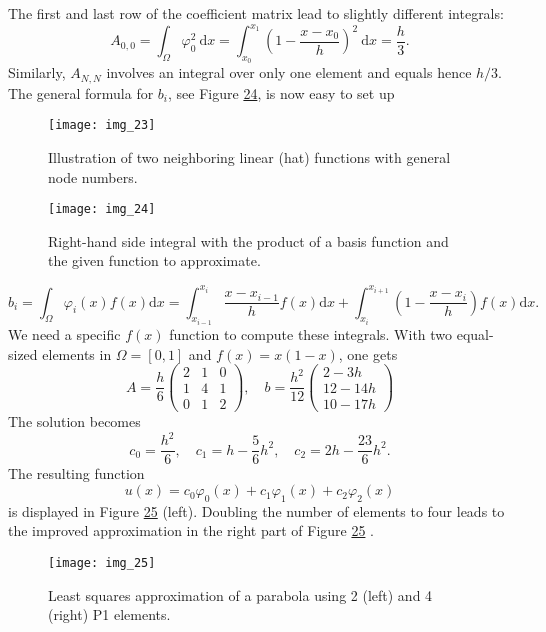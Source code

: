 \documentclass[../main.tex]{subfiles}
\begin{document}
The first and last row of the coefficient matrix lead to slightly different integrals:
$$
A_{0,0}=\int_{\Omega} \varphi_{0}^{2} \mathrm{~d} x=\int_{x_{0}}^{x_{1}}\left(1-\frac{x-x_{0}}{h}\right)^{2} \mathrm{~d} x=\frac{h}{3}.
$$
Similarly, $A_{N, N}$ involves an integral over only one element and equals hence $h / 3$. The general formula for $b_{i}$, see Figure \hyperref[fig:img_24]{24}, is now easy to set up
\begin{figure}[H]
	\centering
	\texttt{[image: img\_23]}
	\caption{Illustration of two neighboring linear (hat) functions with general
		node numbers.}
	\label{fig:img_23}
\end{figure}
\begin{figure}[H]
	\centering
	\texttt{[image: img\_24]}
	\caption{Right-hand side integral with the product of a basis function and
		the given function to approximate.}
	\label{fig:img_24}
\end{figure}
\begin{equation}\label{eqa56}
	b_{i}=\int_{\Omega} \varphi_{i}(x) f(x) \mathrm{d} x=\int_{x_{i-1}}^{x_{i}} \frac{x-x_{i-1}}{h} f(x) \mathrm{d} x+\int_{x_{i}}^{x_{i+1}}\left(1-\frac{x-x_{i}}{h}\right) f(x) \mathrm{d} x.
\end{equation}
We need a specific $f(x)$ function to compute these integrals. With two equal-sized elements in $\Omega=[0,1]$ and $f(x)=x(1-x)$, one gets
$$
A=\frac{h}{6}\left(\begin{array}{ccc}
	2 & 1 & 0 \\
	1 & 4 & 1 \\
	0 & 1 & 2
\end{array}\right), \quad b=\frac{h^{2}}{12}\left(\begin{array}{c}
	2-3 h \\
	12-14 h \\
	10-17 h
\end{array}\right)
$$
The solution becomes
$$
c_{0}=\frac{h^{2}}{6}, \quad c_{1}=h-\frac{5}{6} h^{2}, \quad c_{2}=2 h-\frac{23}{6} h^{2}.
$$
The resulting function
$$
u(x)=c_{0} \varphi_{0}(x)+c_{1} \varphi_{1}(x)+c_{2} \varphi_{2}(x)
$$
is displayed in Figure \hyperref[fig:img_25]{25} (left). Doubling the number of elements to four leads to the improved approximation in the right part of Figure \hyperref[fig:img_25]{25} .
\begin{figure}[H]
	\centering
	\texttt{[image: img\_25]}
	\caption{Least squares approximation of a parabola using 2 (left) and 4
		(right) P1 elements.}
	\label{fig:img_25}
\end{figure}
\end{document}
